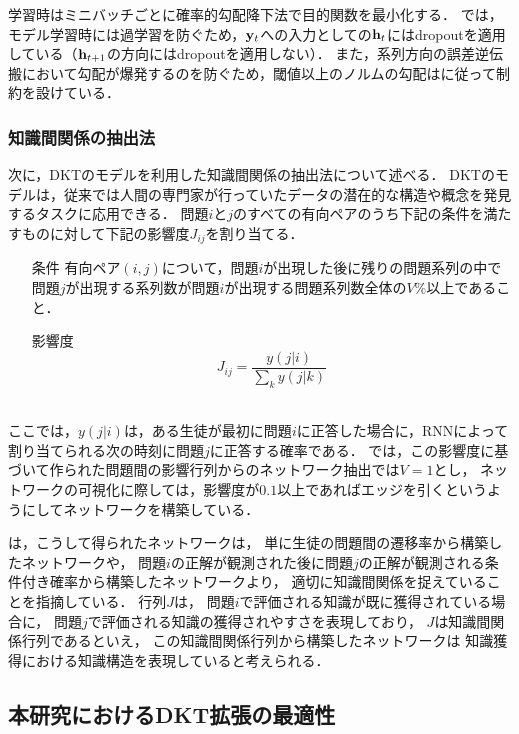 学習時はミニバッチごとに確率的勾配降下法で目的関数を最小化する．
\cite{piech2015deep}では，モデル学習時には過学習を防ぐため，${\bf y}_t$への入力としての${\bf h}_t$にはdropout\cite{srivastava2014dropout}を適用している（${\bf h}_{t+1}$の方向にはdropoutを適用しない）．
また，系列方向の誤差逆伝搬\cite{werbos1990backpropagation}において勾配が爆発するのを防ぐため，閾値以上のノルムの勾配は\cite{pascanu2013difficulty}に従って制約を設けている．


\subsubsection{知識間関係の抽出法}
次に，DKTのモデルを利用した知識間関係の抽出法について述べる．
DKTのモデルは，従来では人間の専門家が行っていたデータの潜在的な構造や概念を発見するタスクに応用できる．
問題$i$と$j$のすべての有向ペアのうち下記の条件を満たすものに対して下記の影響度$J_{ij}$を割り当てる．\\
\begin{itemize}
	\item [条件]有向ペア$(i, j)$について，問題$i$が出現した後に残りの問題系列の中で問題$j$が出現する系列数が問題$i$が出現する問題系列数全体の$V\%$以上であること．
	\item[影響度]
$$J_{ij} = \frac{y(j|i)}{\sum_k y(j|k)}$$\\
\end{itemize}
ここでは，$y(j|i)$は，ある生徒が最初に問題$i$に正答した場合に，RNNによって割り当てられる次の時刻に問題$j$に正答する確率である．
\cite{piech2015deep}では，この影響度に基づいて作られた問題間の影響行列からのネットワーク抽出では$V=1$とし，
ネットワークの可視化に際しては，影響度が$0.1$以上であればエッジを引くというようにしてネットワークを構築している．

\cite{piech2015deep}は，こうして得られたネットワークは，
単に生徒の問題間の遷移率から構築したネットワークや，
問題$i$の正解が観測された後に問題$j$の正解が観測される条件付き確率から構築したネットワークより，
適切に知識間関係を捉えていることを指摘している．
行列$J$は，
問題$i$で評価される知識が既に獲得されている場合に，
問題$j$で評価される知識の獲得されやすさを表現しており，
$J$は知識間関係行列であるといえ，
この知識間関係行列から構築したネットワークは
知識獲得における知識構造を表現していると考えられる．


\subsection{本研究におけるDKT拡張の最適性}

